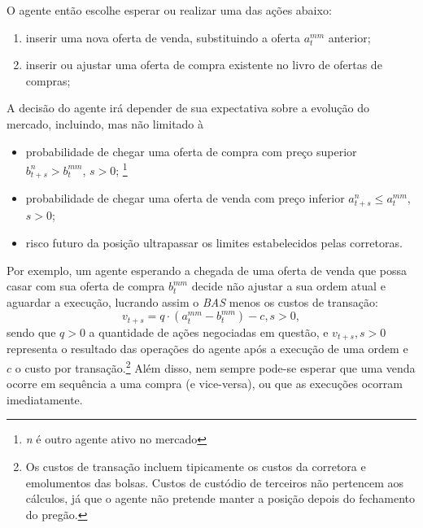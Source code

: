 O agente então escolhe esperar ou realizar uma das ações abaixo:
\begin{enumerate}
    \item inserir uma nova oferta de venda, substituindo a oferta $a_t^{mm}$ anterior;
    \item inserir ou ajustar uma oferta de compra existente no livro de ofertas de compras;
\end{enumerate}

A decisão do agente irá depender de sua expectativa sobre a evolução do mercado, incluindo, mas não limitado à
\begin{itemize}
    \item probabilidade de chegar uma oferta de compra com preço superior $b_{t + s}^{n} > b_{t}^{mm}$, $s > 0$; \footnote{\label{agent}\textit{n} é outro agente ativo no mercado}
    \item probabilidade de chegar uma oferta de venda com preço inferior $a_{t + s}^{n} \leq a_{t}^{mm}$, $s > 0$; 
    \item risco futuro da posição ultrapassar os limites estabelecidos pelas corretoras.
\end{itemize}

Por exemplo, um agente esperando a chegada de uma oferta de venda que possa casar com sua oferta de compra $b_{t}^{mm}$ decide não ajustar a sua ordem atual e aguardar a execução, lucrando assim o \textit{BAS} menos os custos de transação:
\begin{equation*}
    v_{t + s} = q \cdot \left(a_t^{mm} - b_t^{mm}\right) - c, s > 0,
\end{equation*}
sendo que $q > 0$ a quantidade de ações negociadas em questão, e $v_{t + s}, s > 0$ representa o resultado das operações do agente após a execução de uma ordem e $c$ o custo por transação.\footnote{Os custos de transação incluem tipicamente os custos da corretora e emolumentos das bolsas. Custos de custódio de terceiros não pertencem aos cálculos, já que o agente não pretende manter a posição depois do fechamento do pregão.} Além disso, nem sempre pode-se esperar que uma venda ocorre em sequência a uma compra (e vice-versa), ou que as execuções ocorram imediatamente.

